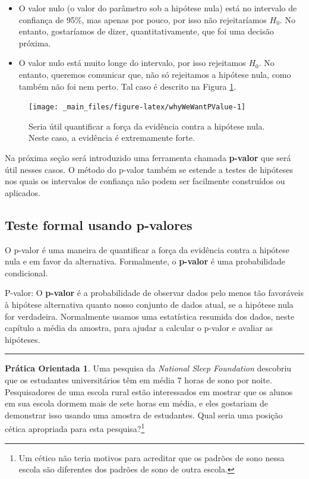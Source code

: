 \documentclass[
]{book}
\theoremstyle{definition}
\theoremstyle{definition}
\theoremstyle{definition}
\newtheorem{exercise}{Prática Orientada}[chapter]
\theoremstyle{definition}
\theoremstyle{remark}
\begin{document}
\begin{itemize}
\item
  O valor nulo (o valor do parâmetro sob a hipótese nula) está no intervalo de confiança de 95\%, mas apenas por pouco, por isso não rejeitaríamos \(H_0\). No entanto, gostaríamos de dizer, quantitativamente, que foi uma decisão próxima.
\item
  O valor nulo está muito longe do intervalo, por isso rejeitamos \(H_0\). No entanto, queremos comunicar que, não só rejeitamos a hipótese nula, como também não foi nem perto. Tal caso é descrito na Figura \ref{fig:whyWeWantPValue}.
\end{itemize}

\begin{figure}

{\centering \texttt{[image: \_main\_files/figure-latex/whyWeWantPValue-1]} 

}

\caption{Seria útil quantificar a força da evidência contra a hipótese nula. Neste caso, a evidência é extremamente forte.}\label{fig:whyWeWantPValue}
\end{figure}

Na próxima seção será introduzido uma ferramenta chamada \textbf{p-valor} que será útil nesses casos. O método do p-valor também se estende a testes de hipóteses nos quais os intervalos de confiança não podem ser facilmente construídos ou aplicados.

\hypertarget{formalTestPValue}{%
\subsection{Teste formal usando p-valores}\label{formalTestPValue}}

O p-valor é uma maneira de quantificar a força da evidência contra a hipótese nula e em favor da alternativa. Formalmente, o \textbf{p-valor} é uma probabilidade condicional.

P-valor: O \textbf{p-valor} é a probabilidade de observar dados pelo menos tão favoráveis à hipótese alternativa quanto nosso conjunto de dados atual, se a hipótese nula for verdadeira. Normalmente usamos uma estatística resumida dos dados, neste capítulo a média da amostra, para ajudar a calcular o p-valor e avaliar as hipóteses.

\begin{center}\rule{0.5\linewidth}{0.5pt}\end{center}

\begin{exercise}
\protect\hypertarget{exr:unnamed-chunk-163}{}{\label{exr:unnamed-chunk-163} }Uma pesquisa da \emph{National Sleep Foundation} descobriu que os estudantes universitários têm em média 7 horas de sono por noite. Pesquisadores de uma escola rural estão interessados em mostrar que os alunos em sua escola dormem mais de sete horas em média, e eles gostariam de demonstrar isso usando uma amostra de estudantes. Qual seria uma posição cética apropriada para esta pesquisa?\footnote{Um cético não teria motivos para acreditar que os padrões de sono nessa escola são diferentes dos padrões de sono de outra escola.}
\end{exercise}
\end{document}
